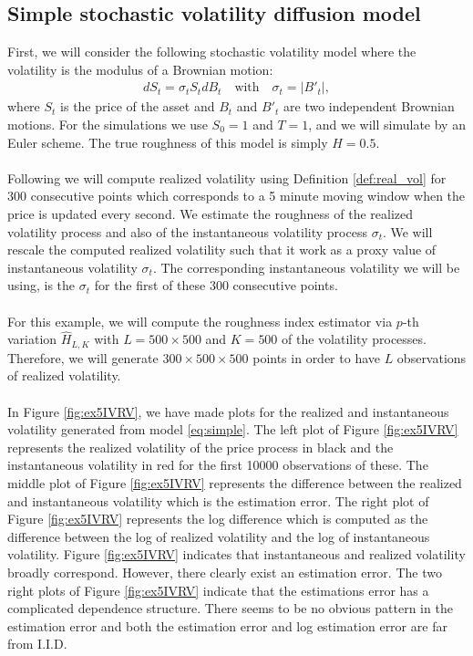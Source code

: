 \documentclass{article}
\begin{document}
\subsection{Simple stochastic volatility diffusion model} \label{sec:ex5}
First, we will consider the following stochastic volatility model where the volatility is the modulus of a Brownian motion:
\begin{align}
dS_t = \sigma_t S_t dB_t \quad \text{with} \quad \sigma_t = \lvert B'_t \rvert, \label{eq:simple}
\end{align}
where $S_t$ is the price of the asset and $B_t$ and $B'_t$ are two independent Brownian motions. For the simulations we use $S_0=1$ and $T=1$, and we will simulate by an Euler scheme. The true roughness of this model is simply $H=0.5$.\\\\
Following \cite{cont} we will compute realized volatility using Definition \ref{def:real_vol} for 300 consecutive points which corresponds to a 5 minute moving window when the price is updated every second. We estimate the roughness of the realized volatility process and also of the instantaneous volatility process $\sigma_t$. We will rescale the computed realized volatility such that it work as a proxy value of instantaneous volatility $\sigma_t$. The corresponding instantaneous volatility we will be using, is the $\sigma_t$ for the first of these 300 consecutive points. \\\\
For this example, we will compute the roughness index estimator via $p$-th variation $\widehat{H}_{L, K}$ with $L=500\times 500$ and $K=500$ of the volatility processes. Therefore, we will generate $300\times500\times 500$ points in order to have $L$ observations of realized volatility.\\\\
In Figure \ref{fig:ex5IVRV}, we have made plots for the realized and instantaneous volatility generated from model \eqref{eq:simple}. The left plot of Figure \ref{fig:ex5IVRV} represents the realized volatility of the price process in black and the instantaneous volatility in red for the first 10000 observations of these. The middle plot of Figure \ref{fig:ex5IVRV} represents the difference between the realized and instantaneous volatility which is the estimation error. The right plot of Figure \ref{fig:ex5IVRV} represents the log difference which is computed as the difference between the log of realized volatility and the log of instantaneous volatility. Figure \ref{fig:ex5IVRV} indicates that instantaneous and realized volatility broadly correspond. However, there clearly exist an estimation error. The two right plots of Figure \ref{fig:ex5IVRV} indicate that the estimations error has a complicated dependence structure. There seems to be no obvious pattern in the estimation error and both the estimation error and log estimation error are far from I.I.D. 
\end{document}
